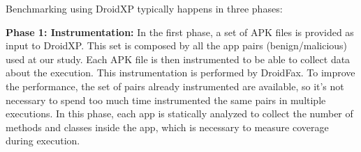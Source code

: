 Benchmarking using DroidXP typically happens in three phases:

\textbf{Phase 1: Instrumentation:} In the first phase, a set of APK files is provided as input to DroidXP. This set is composed by all the app pairs (benign/malicious) used at our study. Each APK file is then instrumented to be able to collect data about the execution. This instrumentation is performed by DroidFax. To improve the performance, the set of pairs already instrumented are available, so it's not necessary to spend too much time instrumented the same pairs in multiple executions. In this phase, each app is statically analyzed to collect the number of methods and classes inside the app, which is necessary to measure coverage during execution. %

